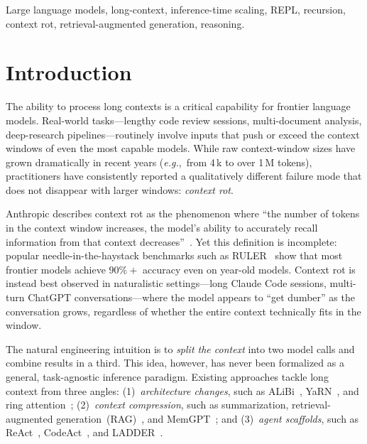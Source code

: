 \documentclass[journal, 10pt, letterpaper]{IEEEtran}
\newcommand{\eg}{\textit{e.g.},\ }
\begin{document}
\begin{IEEEkeywords}
Large language models, long-context, inference-time scaling, REPL, recursion,
context rot, retrieval-augmented generation, reasoning.
\end{IEEEkeywords}

\section{Introduction}
\label{sec:intro}

The ability to process long contexts is a critical capability for frontier
language models. Real-world tasks---lengthy code review sessions,
multi-document analysis, deep-research pipelines---routinely involve inputs
that push or exceed the context windows of even the most capable models.
While raw context-window sizes have grown dramatically in recent years
(\eg from 4\,k to over 1\,M tokens), practitioners have consistently
reported a qualitatively different failure mode that does not disappear with
larger windows: \emph{context rot}.

Anthropic describes context rot as the phenomenon where ``the number of tokens
in the context window increases, the model's ability to accurately recall
information from that context decreases''~\cite{anthropic2025context}.  Yet
this definition is incomplete: popular needle-in-the-haystack benchmarks such
as RULER~\cite{hsieh2024ruler} show that most frontier models achieve $90\%+$
accuracy even on year-old models.  Context rot is instead best observed in
naturalistic settings---long Claude Code sessions, multi-turn ChatGPT
conversations---where the model appears to ``get dumber'' as the conversation
grows, regardless of whether the entire context technically fits in the window.

The natural engineering intuition is to \emph{split the context} into two
model calls and combine results in a third.  This idea, however, has never
been formalized as a general, task-agnostic inference paradigm.  Existing
approaches tackle long context from three angles: (1)~\emph{architecture
changes}, such as ALiBi~\cite{press2022alibi}, YaRN~\cite{peng2023yarn}, and
ring attention~\cite{liu2024ring}; (2)~\emph{context compression}, such as
summarization, retrieval-augmented generation~(RAG)~\cite{lewis2020rag}, and
MemGPT~\cite{packer2023memgpt}; and (3)~\emph{agent scaffolds}, such as
ReAct~\cite{yao2023react}, CodeAct~\cite{wang2024codeact}, and
LADDER~\cite{levy2025ladder}.
\end{document}

